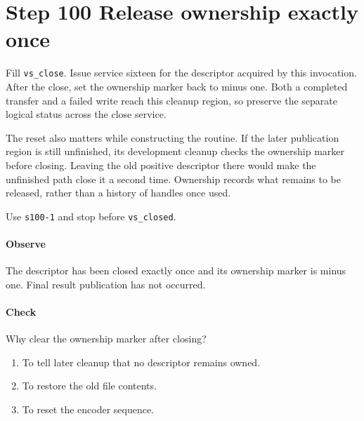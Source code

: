 \section{Step 100 Release ownership exactly once}
Fill \texttt{vs\_close}. Issue service sixteen for the descriptor acquired by this invocation. After the close, set the ownership marker back to minus one. Both a completed transfer and a failed write reach this cleanup region, so preserve the separate logical status across the close service.

The reset also matters while constructing the routine. If the later publication region is still unfinished, its development cleanup checks the ownership marker before closing. Leaving the old positive descriptor there would make the unfinished path close it a second time. Ownership records what remains to be released, rather than a history of handles once used.

Use \texttt{s100-1} and stop before \texttt{vs\_closed}.

\paragraph{Observe} The descriptor has been closed exactly once and its ownership marker is minus one. Final result publication has not occurred.

\paragraph{Check} Why clear the ownership marker after closing?
\begin{enumerate}[label=\Alph*.]
\item To tell later cleanup that no descriptor remains owned.
\item To restore the old file contents.
\item To reset the encoder sequence.
\end{enumerate}
